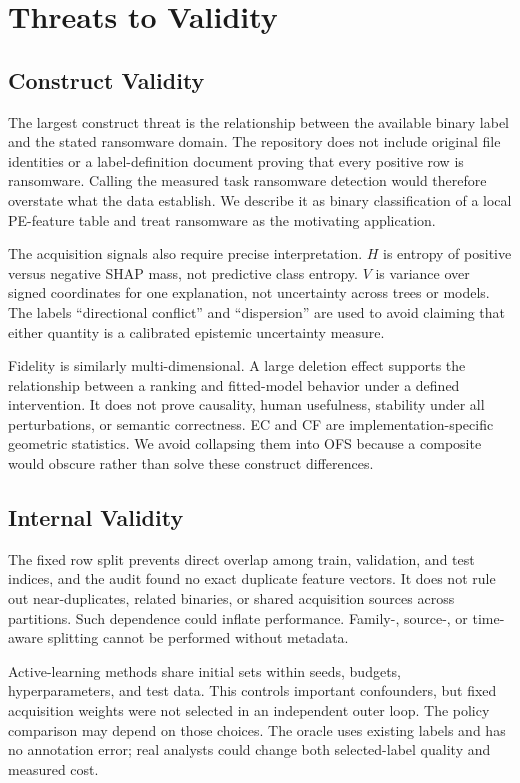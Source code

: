 \section{Threats to Validity}
\label{sec:threats}

\subsection{Construct Validity}

The largest construct threat is the relationship between the available binary
label and the stated ransomware domain. The repository does not include original
file identities or a label-definition document proving that every positive row
is ransomware. Calling the measured task ransomware detection would therefore
overstate what the data establish. We describe it as binary classification of a
local PE-feature table and treat ransomware as the motivating application.

The acquisition signals also require precise interpretation. $H$ is entropy of
positive versus negative SHAP mass, not predictive class entropy. $V$ is variance
over signed coordinates for one explanation, not uncertainty across trees or
models. The labels ``directional conflict'' and ``dispersion'' are used to avoid
claiming that either quantity is a calibrated epistemic uncertainty measure.

Fidelity is similarly multi-dimensional. A large deletion effect supports the
relationship between a ranking and fitted-model behavior under a defined
intervention. It does not prove causality, human usefulness, stability under all
perturbations, or semantic correctness. EC and CF are implementation-specific
geometric statistics. We avoid collapsing them into OFS because a composite
would obscure rather than solve these construct differences.

\subsection{Internal Validity}

The fixed row split prevents direct overlap among train, validation, and test
indices, and the audit found no exact duplicate feature vectors. It does not rule
out near-duplicates, related binaries, or shared acquisition sources across
partitions. Such dependence could inflate performance. Family-, source-, or
time-aware splitting cannot be performed without metadata.

Active-learning methods share initial sets within seeds, budgets, hyperparameters,
and test data. This controls important confounders, but fixed acquisition weights
were not selected in an independent outer loop. The policy comparison may depend
on those choices. The oracle uses existing labels and has no annotation error;
real analysts could change both selected-label quality and measured cost.

